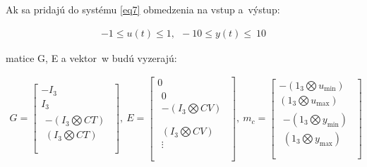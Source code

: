 Ak sa pridajú do systému \ref{eq7} obmedzenia na vstup a~výstup:

\begin{equation} \label{eq20}
\begin{split}
- 1 \leq u\left( t \right) \leq 1,\ \  - 10 \leq y\left( t \right) \leq \ 10
\end{split}
\end{equation}

matice G, E a vektor~w budú vyzerajú:

\begin{equation} \label{eq21}
\begin{split}
G = \begin{bmatrix}
{- I}_{3} \\
I_{3} \\
\begin{matrix}
 - (I_{3}\bigotimes CT) \\
(I_{3}\bigotimes CT) \\
\end{matrix} \\
\end{bmatrix},\ E = \begin{bmatrix}
0 \\
\begin{matrix}
0 \\
 - (I_{3}\bigotimes CV) \\
\end{matrix} \\
\begin{matrix}
(I_{3}\bigotimes CV) \\
 \vdots \\
\end{matrix} \\
\end{bmatrix},\ m_{c} = \begin{bmatrix}
 - (1_{3}\bigotimes u_{\min}) \\
(1_{3}\bigotimes u_{\max}) \\
\begin{matrix}
 - (1_{3}\bigotimes y_{\min}) \\
(1_{3}\bigotimes y_{\max}) \\
\end{matrix} \\
\end{bmatrix}
\end{split}
\end{equation}

